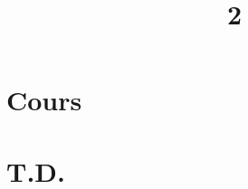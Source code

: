 \documentclass[a4paper]{article}
\title{2}{Algèbre linéaire}
\begin{document}
	\part{Cours}
	
	
	
	
	
	
	\clearpage\null\clearpage
	
	\clearpage\null\clearpage
	\renewcommand{\thesection}{}
	\renewcommand{\thesubsection}{}
	\part{T.D.}
	
	
	
\end{document}

